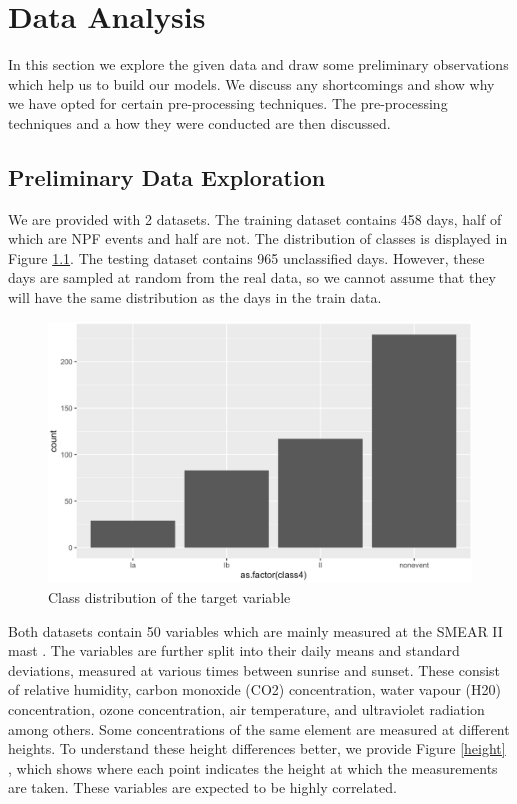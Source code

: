 \chapter{Data Analysis}

In this section we explore the given data and draw some preliminary observations which help us to build our models. We discuss any shortcomings and show why we have opted for certain pre-processing techniques. The pre-processing techniques and a how they were conducted are then discussed.

\section{Preliminary Data Exploration}

We are provided with 2 datasets. The training dataset contains 458 days, half of which are NPF events and half are not. The distribution of classes is displayed in Figure \ref{fig:class_distribution}. The testing dataset contains 965 unclassified days. However, these days are sampled at random from the real data, so we cannot assume that they will have the same distribution as the days in the train data.

\begin{figure}
   \centering
   \includegraphics[width=\textwidth]{images/class_distribution.png}
   \caption{Class distribution of the target variable}
   \label{fig:class_distribution}
\end{figure}


Both datasets contain 50 variables which are mainly measured at the SMEAR II mast \cite{npf_paper}. The variables are further split into their daily means and standard deviations, measured at various times between sunrise and sunset. These consist of relative humidity, carbon monoxide (CO2) concentration, water vapour (H20) concentration, ozone concentration, air temperature, and ultraviolet radiation among others. Some concentrations of the same element are measured at different heights. To understand these height differences better, we provide Figure \ref{height} , which shows where each point indicates the height at which the measurements are taken. These variables are expected to be highly correlated.

